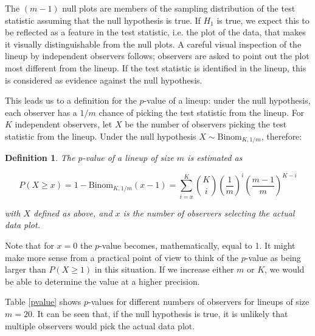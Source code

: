 \documentclass[12pt]{article}
\newtheorem{dfn}{Definition}[section]
\begin{document}
\noindent The $(m-1)$ null plots are %
members of the sampling distribution of the test statistic assuming that the null hypothesis is true. If $H_1$ is true, we expect this to be reflected as a feature in the test statistic, i.e. the plot of the data, that makes it visually distinguishable from the null plots. A careful visual inspection of the lineup by %
independent observers follows;  observers are asked to point out the plot most different from the lineup. If the test statistic is identified in the lineup, this is considered as evidence against the null hypothesis. 

This leads us to a definition for the $p$-value of a lineup: under the null hypothesis, each observer has a $1/m$ chance of picking the test statistic from the lineup.  For $K$ independent observers, let $X$ be  the number of observers picking the test statistic from the lineup. Under the null hypothesis $X \sim \text{Binom}_{K, 1/m}$,  therefore: 

\begin{dfn}\label{dfn:pvalue}
The $p$-value of a lineup of size $m$ is  estimated as %

\begin{equation}\label{binom}
P(X \ge x) = 1 - \text{Binom}_{{K, 1/m}} (x-1) = \sum_{i=x}^{K} {K \choose i} \left(\frac{1}{m}\right)^{i} \left(\frac{m-1}{m}\right)^{K-i}
\end{equation}

\noindent with $X$ defined as above, and $x$ is the number of observers selecting the actual data plot. 
\end{dfn}
\noindent Note that for $x=0$ the $p$-value becomes, mathematically, equal to 1. It might make more sense from a practical point of view to think of the $p$-value as
being larger than $P(X \ge 1)$ in this situation. If we increase either $m$ or $K$, we would be able to determine the value at a higher precision.

Table \ref{pvalue} shows $p$-values for different numbers of observers for lineups of size $m = 20$. It can be seen that, if the null hypothesis is true, it is unlikely that multiple observers would pick the actual data plot.
\end{document}
